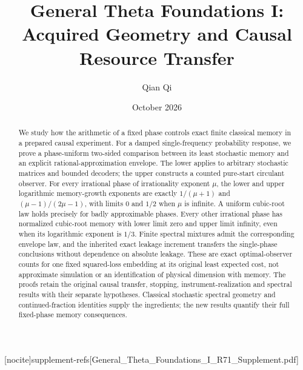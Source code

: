 
[nocite]{supplement-refs}[General_Theta_Foundations_I_R71_Supplement.pdf]
\title[Acquired geometry and causal resource transfer]{General Theta Foundations I:\\Acquired Geometry and Causal Resource Transfer}
\author{Qian Qi}\date{October 2026}

\begin{abstract}
We study how the arithmetic of a fixed phase controls exact finite classical memory in a prepared causal experiment. For a damped single-frequency probability response, we prove a phase-uniform two-sided comparison between its least stochastic memory and an explicit rational-approximation envelope. The lower applies to arbitrary stochastic matrices and bounded decoders; the upper constructs a counted pure-start circulant observer. For every irrational phase of irrationality exponent $\mu$, the lower and upper logarithmic memory-growth exponents are exactly $1/(\mu+1)$ and $(\mu-1)/(2\mu-1)$, with limits $0$ and $1/2$ when $\mu$ is infinite. A uniform cubic-root law holds precisely for badly approximable phases. Every other irrational phase has normalized cubic-root memory with lower limit zero and upper limit infinity, even when its logarithmic exponent is $1/3$. Finite spectral mixtures admit the corresponding envelope law, and the inherited exact leakage increment transfers the single-phase conclusions without dependence on absolute leakage. These are exact optimal-observer counts for one fixed squared-loss embedding at its original least expected cost, not approximate simulation or an identification of physical dimension with memory. The proofs retain the original causal transfer, stopping, instrument-realization and spectral results with their separate hypotheses. Classical stochastic spectral geometry and continued-fraction identities supply the ingredients; the new results quantify their full fixed-phase memory consequences.
\end{abstract}
\maketitle







